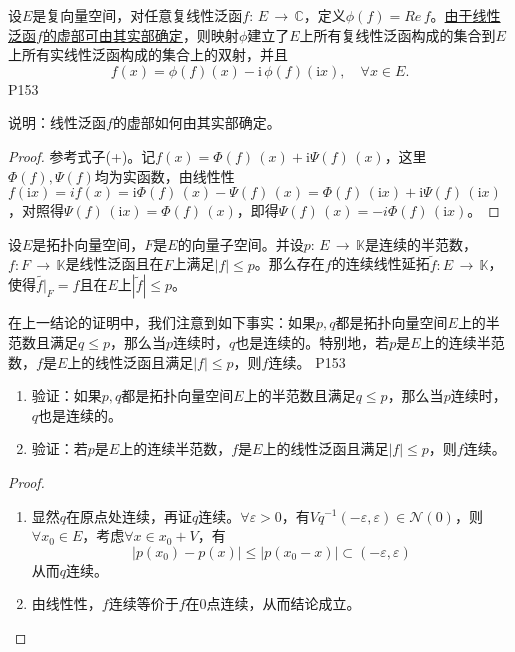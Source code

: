 \original
{
	设$E$是复向量空间，对任意复线性泛函$f:\, E\,\rightarrow\, \mathbb{C} $，定义$\phi(f)=Re\, f $。\underline{由于线性泛函$f$的虚部可由其实部确定}，则映射$\phi$建立了$E$上所有复线性泛函构成的集合到$E$上所有实线性泛函构成的集合上的双射，并且
	\begin{equation*}\tag{+}
		f(x)=\phi (f)(x)-\mathrm{i} \, \phi (f)(\mathrm{i} x),\quad \forall x\in E.
	\end{equation*}
}{P153}

\begin{proposition}
	说明：线性泛函$f$的虚部如何由其实部确定。
\end{proposition}
\begin{proof}
	参考式子(+)。记$f(x)=\Phi(f)\,(x)+\mathrm{i}\Psi(f)\,(x) $，这里$\Phi(f),\Psi(f)$均为实函数，由线性性$f(\mathrm{i}x)=if(x)=\mathrm{i}\Phi(f)\, (x) -\Psi(f) \, (x)= \Phi(f)\, (\mathrm{i}x) +\mathrm{i}\Psi(f)\, (\mathrm{i}x) $，对照得$\Psi(f)\,(\mathrm{i}x)=\Phi(f)\,(x) $，即得$\Psi(f)\, (x)=-i\Phi(f)\, (\mathrm{i}x) $。
\end{proof}

\begin{corollary}
	设$E$是拓扑向量空间，$F$是$E$的向量子空间。并设$p:\,E \, \rightarrow \, \mathbb{K} $是连续的半范数，$f:F\, \rightarrow \, \mathbb{K} $是线性泛函且在$F$上满足$|f|\leq p $。那么存在$f$的连续线性延拓$\tilde{f}: E\, \rightarrow \, \mathbb{K} $，使得$\tilde{f\big| }_{F} =f $且在$E$上$|\tilde{f}|\leq p $。
\end{corollary}

\original
{
	在上一结论的证明中，我们注意到如下事实：如果$p,q$都是拓扑向量空间$E$上的半范数且满足$q\leq p$，那么当$p$连续时，$q$也是连续的。特别地，若$p$是$E$上的连续半范数，$f$是$E$上的线性泛函且满足$|f|\leq p$，则$f$连续。
}{P153}

\begin{proposition}
	\begin{enumerate}
		\item 验证：如果$p,q$都是拓扑向量空间$E$上的半范数且满足$q\leq p$，那么当$p$连续时，$q$也是连续的。
		\item 验证：若$p$是$E$上的连续半范数，$f$是$E$上的线性泛函且满足$|f|\leq p$，则$f$连续。
	\end{enumerate}
\end{proposition}
\begin{proof}
	\begin{enumerate}
		\item 显然$q$在原点处连续，再证$q$连续。$\forall \varepsilon>0$，有$Vq^{-1}(-\varepsilon,\varepsilon)\in \mathcal{N}(0)$，则$\forall x_{0}\in E $，考虑$\forall x\in x_{0}+V$，有
		\begin{equation*}
			|p(x_{0})-p(x)|\leq |p(x_{0}-x)|\subset (-\varepsilon,\varepsilon)
		\end{equation*}
		从而$q$连续。
		\item 由线性性，$f$连续等价于$f$在$0$点连续，从而结论成立。
	\end{enumerate}
\end{proof}

